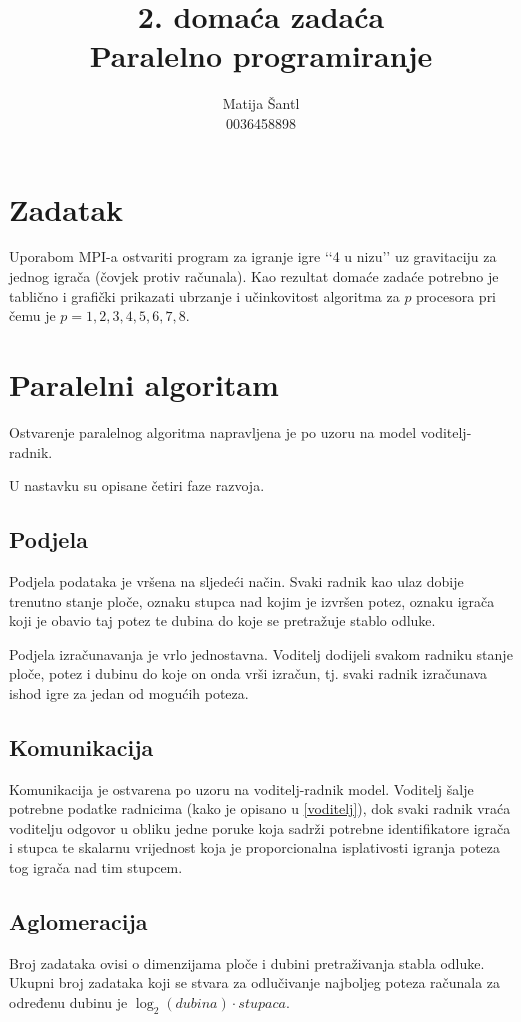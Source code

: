 \documentclass[11pt]{article}
\title{\textbf{2. domaća zadaća}\\
		Paralelno programiranje}
\author{Matija Šantl \\
		0036458898}
\date{}
\begin{document}
\maketitle

\section{Zadatak}
Uporabom MPI-a ostvariti program za igranje igre \lq\lq{}4 u nizu\rq\rq{} uz gravitaciju za jednog igrača (čovjek protiv računala). Kao rezultat domaće zadaće potrebno je tablično i grafički prikazati ubrzanje i učinkovitost algoritma za $p$ procesora pri čemu je $p = 1, 2, 3, 4, 5, 6, 7, 8$.

\section{Paralelni algoritam}

Ostvarenje paralelnog algoritma napravljena je po uzoru na model voditelj-radnik.

U nastavku su opisane četiri faze razvoja.

\subsection{Podjela}
Podjela podataka je vršena na sljedeći način. Svaki radnik kao ulaz dobije trenutno stanje ploče, oznaku stupca nad kojim je izvršen potez, oznaku igrača koji je obavio taj potez te dubina do koje se pretražuje stablo odluke. \label{voditelj}

Podjela izračunavanja je vrlo jednostavna. Voditelj dodijeli svakom radniku stanje ploče, potez i dubinu do koje on onda vrši izračun, tj. svaki radnik izračunava ishod igre za jedan od mogućih poteza.

\subsection{Komunikacija}
Komunikacija je ostvarena po uzoru na voditelj-radnik model. Voditelj šalje potrebne podatke radnicima (kako je opisano u \ref{voditelj}), dok svaki radnik vraća voditelju odgovor u obliku jedne poruke koja sadrži potrebne identifikatore igrača i stupca te skalarnu vrijednost koja je proporcionalna isplativosti igranja poteza tog igrača nad tim stupcem.

\subsection{Aglomeracija}
Broj zadataka ovisi o dimenzijama ploče i dubini pretraživanja stabla odluke. Ukupni broj zadataka koji se stvara za odlučivanje najboljeg poteza računala za određenu dubinu je $\log_{2} (dubina) \cdot stupaca$.
\end{document}

